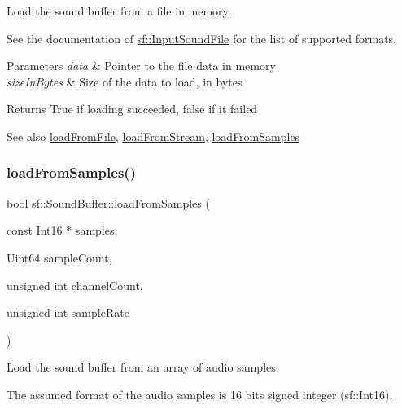 Load the sound buffer from a file in memory. 

See the documentation of \hyperlink{classsf_1_1_input_sound_file}{sf\+::\+Input\+Sound\+File} for the list of supported formats.


\begin{DoxyParams}{Parameters}
{\em data} & Pointer to the file data in memory \\
\hline
{\em size\+In\+Bytes} & Size of the data to load, in bytes\\
\hline
\end{DoxyParams}
\begin{DoxyReturn}{Returns}
True if loading succeeded, false if it failed
\end{DoxyReturn}
\begin{DoxySeeAlso}{See also}
\hyperlink{classsf_1_1_sound_buffer_a2be6a8025c97eb622a7dff6cf2594394}{load\+From\+File}, \hyperlink{classsf_1_1_sound_buffer_ad292156b1e01f6dabd4c0c277d5e079e}{load\+From\+Stream}, \hyperlink{classsf_1_1_sound_buffer_a42d51ce4bb3b60c7ea06f63c273fd063}{load\+From\+Samples} 
\end{DoxySeeAlso}
\mbox{\label{classsf_1_1_sound_buffer_a42d51ce4bb3b60c7ea06f63c273fd063}} 
\subsubsection{\texorpdfstring{load\+From\+Samples()}{loadFromSamples()}}
{\footnotesize\ttfamily bool sf\+::\+Sound\+Buffer\+::load\+From\+Samples (\begin{DoxyParamCaption}\item[{const Int16 $\ast$}]{samples,  }\item[{Uint64}]{sample\+Count,  }\item[{unsigned int}]{channel\+Count,  }\item[{unsigned int}]{sample\+Rate }\end{DoxyParamCaption})}



Load the sound buffer from an array of audio samples. 

The assumed format of the audio samples is 16 bits signed integer (sf\+::\+Int16).


